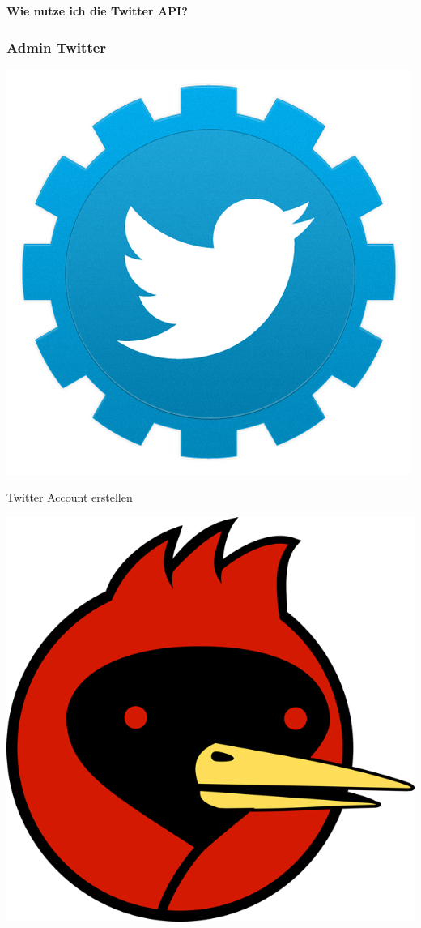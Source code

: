 \documentclass{beamer}
\begin{document}
\begin{frame}
  \begin{center}
    \textbf{Wie nutze ich die Twitter API?}
  \end{center}
\end{frame}
\begin{frame}
  \frametitle{Admin Twitter}
  \begin{minipage}{.2\textwidth}
    \includegraphics[height=.2\textheight]{TwitterAPI}
  \end{minipage}%
  \hfill
  \begin{minipage}{.8\textwidth}
    Twitter Account erstellen \pause \\    
  \end{minipage}
  \begin{minipage}{.2\textwidth}
    \includegraphics[height=.2\textheight]{megaultra_ruby_notext}

\end{minipage}
\end{frame}
\end{document}
